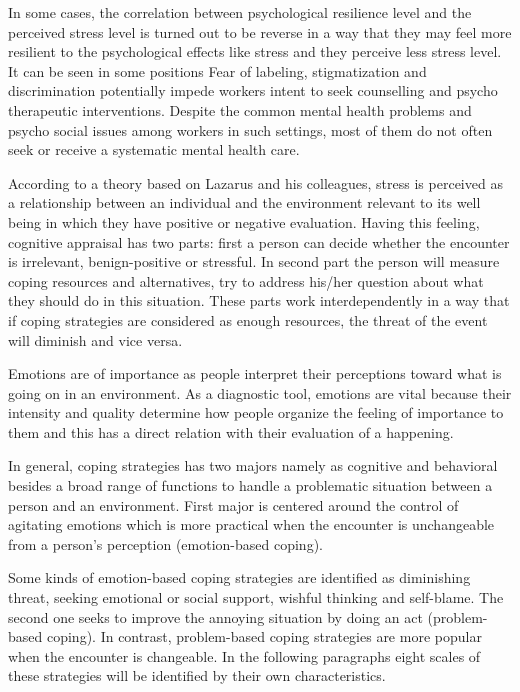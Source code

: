 \documentclass[
11pt, %
oneside, %
english, %
singlespacing, %
]{macthesis} %
\begin{document}
In some cases, the correlation between psychological resilience level and the perceived stress level is turned out to be reverse in a way that they may feel more resilient to the psychological effects like stress and they perceive less stress level. It can be seen in some positions Fear of labeling, stigmatization and discrimination potentially impede workers intent to seek counselling and psycho therapeutic interventions. Despite the common mental health problems and psycho social issues among workers in such settings, most of them do not often seek or receive a systematic mental health care.

According to a theory based on Lazarus and his colleagues, stress is perceived as a relationship between an individual and the environment relevant to its well being in which they have positive or negative evaluation. Having this feeling, cognitive appraisal has two parts: first a person can decide whether the encounter is irrelevant, benign-positive or stressful. In second part the person will measure coping resources and alternatives, try to address his/her question about what they should do in this situation. These parts work interdependently in a way that if coping strategies are considered as enough resources, the threat of the event will diminish and vice versa.

Emotions are of importance as people interpret their perceptions toward what is going on in an environment. As a diagnostic tool, emotions are vital because their intensity and quality determine how people organize the feeling of importance to them and this has a direct relation with their evaluation of a happening.

In general, coping strategies has two majors namely as cognitive and behavioral besides a broad range of functions to handle a problematic situation between a person and an environment. First major is centered around the control of agitating emotions which is more practical when the encounter is unchangeable from a person's perception (emotion-based coping).

Some kinds of emotion-based coping strategies are identified as diminishing threat, seeking emotional or social support, wishful thinking and self-blame. The second one seeks to improve the annoying situation by doing an act (problem-based coping). In contrast, problem-based coping strategies are more popular when the encounter is changeable. In the following paragraphs eight scales of these strategies will be identified by their own characteristics.
\end{document}
